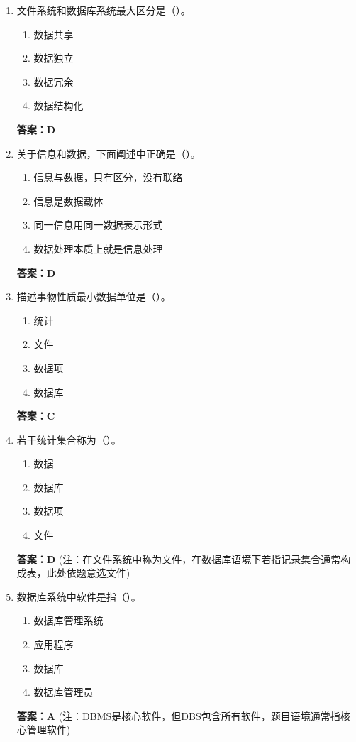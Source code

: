 \documentclass[12pt, a4paper]{article}
\begin{document}
\begin{enumerate}[label=\arabic*.]
    \item 文件系统和数据库系统最大区分是（\quad）。
    \begin{enumerate}
        \item 数据共享
        \item 数据独立
        \item 数据冗余
        \item 数据结构化
    \end{enumerate}
    \textbf{答案：D}

    \item 关于信息和数据，下面阐述中正确是（\quad）。
    \begin{enumerate}
        \item 信息与数据，只有区分，没有联络
        \item 信息是数据载体
        \item 同一信息用同一数据表示形式
        \item 数据处理本质上就是信息处理
    \end{enumerate}
    \textbf{答案：D}

    \item 描述事物性质最小数据单位是（\quad）。
    \begin{enumerate}
        \item 统计
        \item 文件
        \item 数据项
        \item 数据库
    \end{enumerate}
    \textbf{答案：C}

    \item 若干统计集合称为（\quad）。
    \begin{enumerate}
        \item 数据
        \item 数据库
        \item 数据项
        \item 文件
    \end{enumerate}
    \textbf{答案：D} (注：在文件系统中称为文件，在数据库语境下若指记录集合通常构成表，此处依题意选文件)

    \item 数据库系统中软件是指（\quad）。
    \begin{enumerate}
        \item 数据库管理系统
        \item 应用程序
        \item 数据库
        \item 数据库管理员
    \end{enumerate}
    \textbf{答案：A} (注：DBMS是核心软件，但DBS包含所有软件，题目语境通常指核心管理软件)


\end{enumerate}
\end{document}
